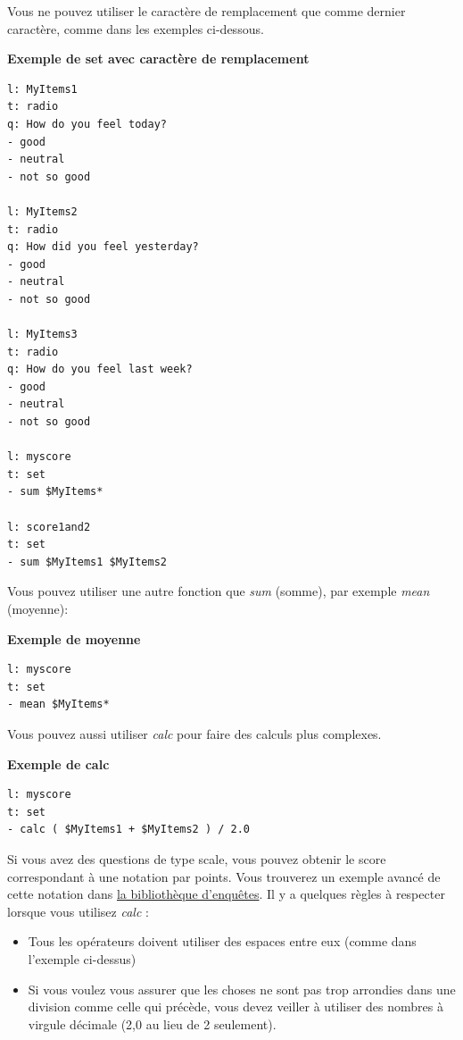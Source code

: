 \documentclass[
]{book}
\providecommand{\tightlist}{%
  \setlength{\itemsep}{0pt}\setlength{\parskip}{0pt}}
\begin{document}
Vous ne pouvez utiliser le caractère de remplacement que comme dernier
caractère, comme dans les exemples ci-dessous.

\textbf{Exemple de set avec caractère de remplacement}

\begin{verbatim}
l: MyItems1
t: radio
q: How do you feel today?
- good
- neutral
- not so good

l: MyItems2
t: radio
q: How did you feel yesterday?
- good
- neutral
- not so good

l: MyItems3
t: radio
q: How do you feel last week?
- good
- neutral
- not so good

l: myscore
t: set
- sum $MyItems*

l: score1and2
t: set
- sum $MyItems1 $MyItems2
\end{verbatim}

Vous pouvez utiliser une autre fonction que \emph{sum} (somme), par
exemple \emph{mean} (moyenne):

\textbf{Exemple de moyenne}

\begin{verbatim}
l: myscore
t: set
- mean $MyItems*
\end{verbatim}

Vous pouvez aussi utiliser \emph{calc} pour faire des calculs plus
complexes.

\textbf{Exemple de calc}

\begin{verbatim}
l: myscore
t: set
- calc ( $MyItems1 + $MyItems2 ) / 2.0
\end{verbatim}

Si vous avez des questions de type scale, vous pouvez obtenir le score
correspondant à une notation par points. Vous trouverez un exemple
avancé de cette notation dans
\href{https://www.psytoolkit.org/survey-library/political-conservatism.html}{la
bibliothèque d'enquêtes}. Il y a quelques règles à respecter lorsque
vous utilisez \emph{calc} :

\begin{itemize}
\tightlist
\item
  Tous les opérateurs doivent utiliser des espaces entre eux (comme dans
  l'exemple ci-dessus)
\item
  Si vous voulez vous assurer que les choses ne sont pas trop arrondies
  dans une division comme celle qui précède, vous devez veiller à
  utiliser des nombres à virgule décimale (2,0 au lieu de 2 seulement).
\end{itemize}
\end{document}
